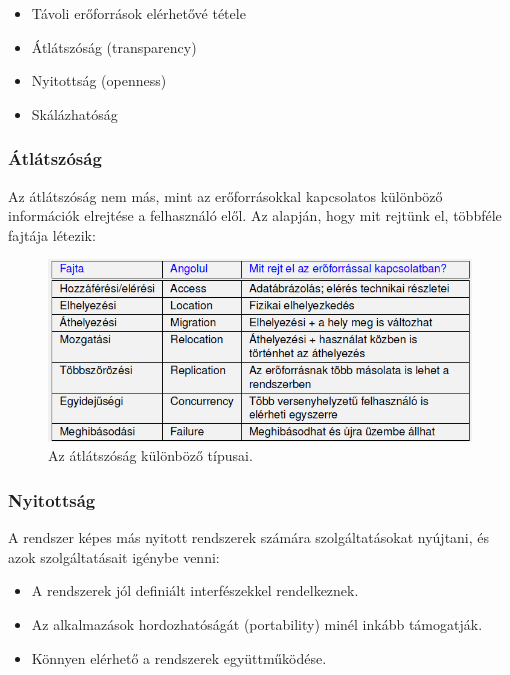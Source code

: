 \documentclass[12pt]{article}
\begin{document}
	\begin{itemize}
		\item	Távoli erőforrások elérhetővé tétele

		\item	Átlátszóság (transparency)
		
		\item	Nyitottság (openness)
		
		\item	Skálázhatóság
	\end{itemize}
	
	\subsubsection{Átlátszóság}
	
	Az átlátszóság nem más, mint az erőforrásokkal kapcsolatos különböző információk elrejtése a felhasználó elől.
	Az alapján, hogy mit rejtünk el, többféle fajtája létezik:
	
	\begin{figure}[H]
		\centering
		\includegraphics[width=0.8\linewidth]{img/atlatszosag}
		\caption{Az átlátszóság különböző típusai.}
		\label{fig:atlatszosag}
	\end{figure}
	
	\subsubsection{Nyitottság}
	
	A rendszer képes más nyitott rendszerek számára szolgáltatásokat nyújtani, és azok szolgáltatásait igénybe venni:
	
	\begin{itemize}
		\item	A rendszerek jól definiált interfészekkel rendelkeznek.
		\item	Az alkalmazások hordozhatóságát (portability) minél inkább támogatják.
		\item	Könnyen elérhető a rendszerek együttműködése.
	\end{itemize}
	
\end{document}

